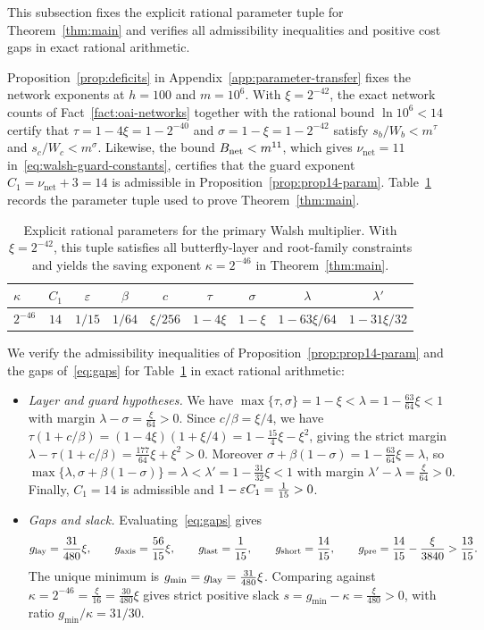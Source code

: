 This subsection fixes the explicit rational parameter tuple for Theorem~\ref{thm:main} and verifies all admissibility
inequalities and positive cost gaps in exact rational arithmetic.

Proposition~\ref{prop:deficits} in Appendix~\ref{app:parameter-transfer} fixes the network exponents at $h=100$ and
$m=10^6$. With $\xi=2^{-42}$, the exact network counts of Fact~\ref{fact:oai-networks} together with the rational bound
$\ln 10^6<14$ certify that $\tau=1-4\xi=1-2^{-40}$ and $\sigma=1-\xi=1-2^{-42}$ satisfy $s_b/W_b<m^\tau$ and
$s_c/W_c<m^\sigma$. Likewise, the
bound $B_{\rm net}<m^{11}$, which gives $\nu_{\mathrm{net}}=11$ in~\eqref{eq:walsh-guard-constants}, certifies that the
guard exponent $C_1=\nu_{\mathrm{net}}+3=14$ is admissible in Proposition~\ref{prop:prop14-param}.
Table~\ref{tab:walsh-rows} records the parameter tuple used to prove Theorem~\ref{thm:main}.

\begin{table}[ht]
\centering
\caption{Explicit rational parameters for the primary Walsh multiplier. With $\xi=2^{-42}$, this tuple satisfies all
butterfly-layer and root-family constraints and yields the saving exponent $\kappa=2^{-46}$ in
Theorem~\ref{thm:main}.}\label{tab:walsh-rows}
\begin{tabular}{@{}lcccccccc@{}}
\toprule
$\kappa$ & $C_1$ & $\varepsilon$ & $\beta$ & $c$ & $\tau$ & $\sigma$ & $\lambda$ & $\lambda'$\\
\midrule
$2^{-46}$ & $14$ & $1/15$ & $1/64$ & $\xi/256$ & $1-4\xi$ & $1-\xi$ & $1-63\xi/64$ & $1-31\xi/32$\\
\bottomrule
\end{tabular}
\end{table}

We verify the admissibility inequalities of Proposition~\ref{prop:prop14-param} and the gaps of~\eqref{eq:gaps} for
Table~\ref{tab:walsh-rows} in exact rational arithmetic:
\begin{itemize}[leftmargin=*]
  \item \emph{Layer and guard hypotheses.} We have $\max\{\tau,\sigma\}=1-\xi<\lambda=1-\frac{63}{64}\xi<1$ with margin
    $\lambda-\sigma=\frac{\xi}{64}>0$. Since $c/\beta=\xi/4$, we have
    $\tau(1+c/\beta)=(1-4\xi)(1+\xi/4)=1-\frac{15}{4}\xi-\xi^2$, giving the strict margin
    $\lambda-\tau(1+c/\beta)=\frac{177}{64}\xi+\xi^2>0$. Moreover $\sigma+\beta(1-\sigma)=1-\frac{63}{64}\xi=\lambda$, so
    $\max\{\lambda,\sigma+\beta(1-\sigma)\}=\lambda<\lambda'=1-\frac{31}{32}\xi<1$ with margin
    $\lambda'-\lambda=\frac{\xi}{64}>0$. Finally, $C_1=14$ is admissible and $1-\varepsilon C_1=\frac1{15}>0$.

  \item \emph{Gaps and slack.} Evaluating~\eqref{eq:gaps} gives
    \[
      g_{\rm lay}=\frac{31}{480}\xi,\qquad g_{\rm axis}=\frac{56}{15}\xi,\qquad g_{\rm last}=\frac1{15},\qquad
      g_{\rm short}=\frac{14}{15},\qquad g_{\rm pre}=\frac{14}{15}-\frac{\xi}{3840}>\frac{13}{15}.
    \]
    The unique minimum is $g_{\min}=g_{\rm lay}=\frac{31}{480}\xi$. Comparing against $\kappa=2^{-46}=\frac{\xi}{16}
    =\frac{30}{480}\xi$ gives strict positive slack $s=g_{\min}-\kappa=\frac{\xi}{480}>0$, with ratio
    $g_{\min}/\kappa=31/30$.
\end{itemize}

